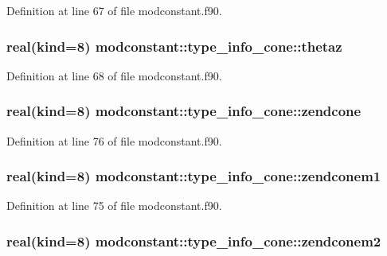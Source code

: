 Definition at line 67 of file modconstant.\-f90.

\hypertarget{structmodconstant_1_1type__info__cone_a35b998348dba2480493184bfc233cbce}{
\subsubsection[{thetaz}]{\setlength{\rightskip}{0pt plus 5cm}real(kind=8) modconstant\-::type\-\_\-info\-\_\-cone\-::thetaz}}\label{structmodconstant_1_1type__info__cone_a35b998348dba2480493184bfc233cbce}


Definition at line 68 of file modconstant.\-f90.

\hypertarget{structmodconstant_1_1type__info__cone_a428fa5cbc5b172b6bf31b5f14b746805}{
\subsubsection[{zendcone}]{\setlength{\rightskip}{0pt plus 5cm}real(kind=8) modconstant\-::type\-\_\-info\-\_\-cone\-::zendcone}}\label{structmodconstant_1_1type__info__cone_a428fa5cbc5b172b6bf31b5f14b746805}


Definition at line 76 of file modconstant.\-f90.

\hypertarget{structmodconstant_1_1type__info__cone_a4e21c02ef86bb4716ef5334271ef5d54}{
\subsubsection[{zendconem1}]{\setlength{\rightskip}{0pt plus 5cm}real(kind=8) modconstant\-::type\-\_\-info\-\_\-cone\-::zendconem1}}\label{structmodconstant_1_1type__info__cone_a4e21c02ef86bb4716ef5334271ef5d54}


Definition at line 75 of file modconstant.\-f90.

\hypertarget{structmodconstant_1_1type__info__cone_a8bf3672f46fde7d43e227a5ae7970c1d}{
\subsubsection[{zendconem2}]{\setlength{\rightskip}{0pt plus 5cm}real(kind=8) modconstant\-::type\-\_\-info\-\_\-cone\-::zendconem2}}\label{structmodconstant_1_1type__info__cone_a8bf3672f46fde7d43e227a5ae7970c1d}


